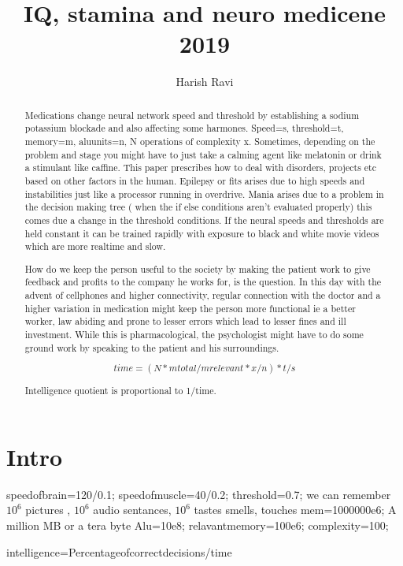 \documentclass[a4paper]{article}
\title{ IQ, stamina and neuro medicene 2019}
\author{Harish Ravi}
\begin{document}
\maketitle

\begin{abstract}
Medications change neural network speed and threshold by establishing a sodium potassium blockade and also affecting some harmones. Speed=s, threshold=t, memory=m, aluunits=n, N operations of complexity x. Sometimes, depending on the problem and stage you might have to just take a calming agent like melatonin or drink a stimulant like caffine. This paper prescribes how to deal with disorders, projects etc based on other factors in the human. Epilepsy or fits arises due to high speeds and instabilities just like a processor running in overdrive. Mania arises due to a problem in the decision making tree ( when the if else conditions aren't evaluated properly) this comes due a change in the threshold conditions. If the neural speeds and thresholds are held constant it can be trained rapidly with exposure to black and white movie videos which are more realtime and slow.

How do we keep the person useful to the society by making the patient work to give feedback and profits to the company he works for, is the question. In this day with the advent of cellphones and higher connectivity, regular connection with the doctor and a higher variation in medication might keep the person more functional ie a better worker, law abiding and prone to lesser errors which lead to lesser fines and ill investment. While this is pharmacological, the psychologist might have to do some ground work by speaking to the patient and his surroundings.

$$time=(N*mtotal/mrelevant*x/n)*t/s$$

Intelligence quotient is proportional to 1/time.

\end{abstract}

\section{Intro}

speedofbrain=120/0.1;
speedofmuscle=40/0.2;
threshold=0.7;
we can remember $10^6$ pictures , $10^6$ audio sentances, $10^6$ tastes smells, touches
mem=1000000e6;  A million MB or a tera byte
Alu=10e8;
relavantmemory=100e6;
complexity=100;

intelligence=Percentageofcorrectdecisions/time
\end{document}
